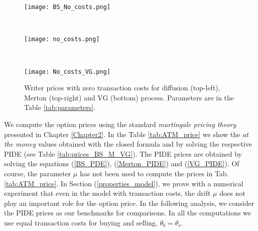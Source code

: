 \begin{figure}[t!]
 \begin{minipage}[b]{0.5\linewidth}
   \centering
   \texttt{[image: BS\_No\_costs.png]}
 \end{minipage}
 \ \hspace{2mm} \hspace{3mm} \
 \begin{minipage}[b]{0.5\linewidth}
  \centering
   \texttt{[image: no\_costs.png]}
 \end{minipage}
  \ \hspace{2mm} \hspace{3mm} \
  \begin{minipage}[b]{\linewidth}
  \centering
   \texttt{[image: No\_costs\_VG.png]}
   \caption{Writer prices with zero transaction costs for diffusion (top-left), Merton (top-right) and VG (bottom) process. Parameters are in the Table \ref{tab:parameters}.}
   \label{Fig1}
 \end{minipage}
\end{figure}
We compute the option prices using the standard 
\emph{martingale pricing theory} presented in Chapter \ref{Chapter2}. In the Table \ref{tab:ATM_price} we show the \emph{at the money} values obtained with the closed formula 
and by solving the respective PIDE (see Table \ref{tab:prices_BS_M_VG}). 
The PIDE prices are obtained by solving the equations (\ref{BS_PDE}), (\ref{Merton_PIDE}) and (\ref{VG_PIDE}).
Of course, the parameter $\mu$ has not been used to compute the prices in Tab. \ref{tab:ATM_price}. 
In Section (\ref{properties_model}), we prove with a numerical experiment that
even in the model with transaction costs, the drift $\mu$ does not play an important role for the option price.
In the following analysis, we consider the PIDE prices as our benchmarks for comparisons.   
In all the computations we use equal transaction costs for buying and selling, $\theta_b = \theta_s$.



